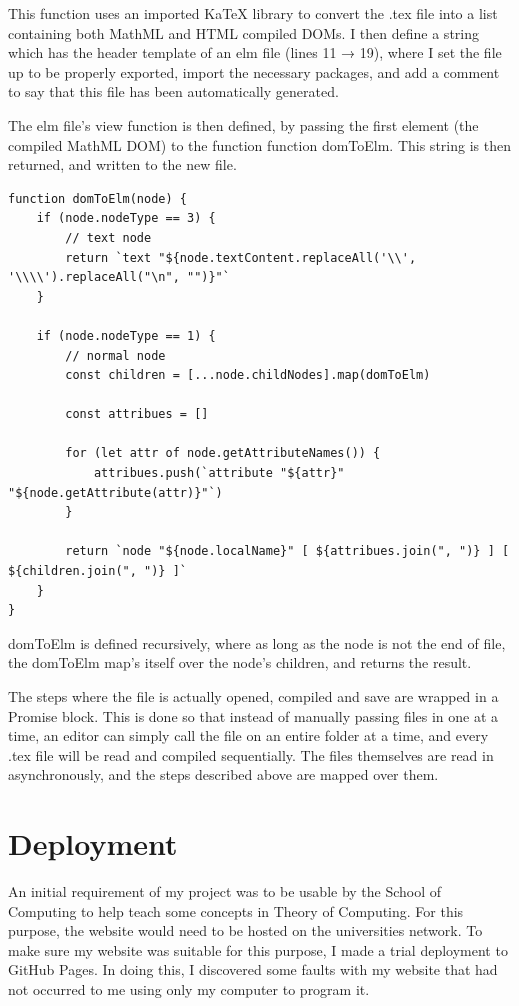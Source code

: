 \documentclass{l4proj}
\begin{document}
This function uses an imported KaTeX library to convert the .tex file into a list containing both MathML and HTML compiled DOMs.  I then define a string which has the header template of an elm file (lines 11 → 19), where I set the file up to be properly exported, import the necessary packages, and add a comment to say that this file has been automatically generated.

The elm file's view function is then defined, by passing the first element (the compiled MathML DOM) to the function function domToElm.  This string is then returned, and written to the new file.

\begin{lstlisting}
function domToElm(node) {
    if (node.nodeType == 3) {
        // text node
        return `text "${node.textContent.replaceAll('\\', '\\\\').replaceAll("\n", "")}"`
    }

    if (node.nodeType == 1) {
        // normal node
        const children = [...node.childNodes].map(domToElm)

        const attribues = []

        for (let attr of node.getAttributeNames()) {
            attribues.push(`attribute "${attr}" "${node.getAttribute(attr)}"`)
        }

        return `node "${node.localName}" [ ${attribues.join(", ")} ] [ ${children.join(", ")} ]`
    }
}
\end{lstlisting}

domToElm is defined recursively, where as long as the node is not the end of file, the domToElm map's itself over the node's children, and returns the result.

The steps where the file is actually opened, compiled and save are wrapped in a Promise block. This is done so that instead of manually passing files in one at a time, an editor can simply call the file on an entire folder at a time, and every .tex file will be read and compiled sequentially.  The files themselves are read in asynchronously, and the steps described above are mapped over them.

\section{Deployment}

An initial requirement of my project was to be usable by the School of Computing to help teach some concepts in Theory of Computing.  For this purpose, the website would need to be hosted on the universities network.  To make sure my website was suitable for this purpose, I made a trial deployment to GitHub Pages.  In doing this, I discovered some faults with my website that had not occurred to me using only my computer to program it.
\end{document}

